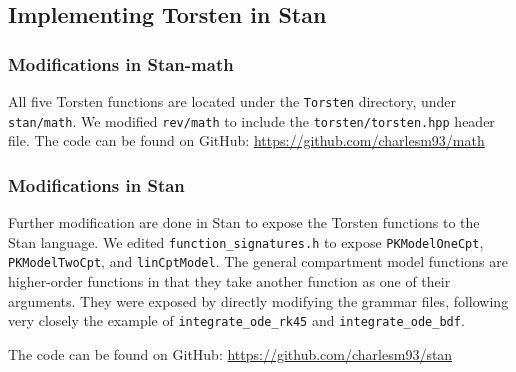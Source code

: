 \documentclass[11pt]{amsart}
\begin{document}
\subsection*{Implementing Torsten in Stan}
\subsubsection*{Modifications in Stan-math}
All five Torsten functions are located under the \texttt{Torsten} directory, under \texttt{stan/math}. We modified \texttt{rev/math} to include the \texttt{torsten/torsten.hpp} header file. The code can be found on GitHub: \url{https://github.com/charlesm93/math} 

\subsubsection*{Modifications in Stan}
Further modification are done in Stan to expose the Torsten functions to the Stan language. We edited \texttt{function\_signatures.h} to expose \texttt{PKModelOneCpt}, \texttt{PKModelTwoCpt}, and \texttt{linCptModel}. The general compartment model functions are higher-order functions in that they take another function as one of their arguments. They were exposed by directly modifying the grammar files, following very closely the example of \texttt{integrate\_ode\_rk45} and \texttt{integrate\_ode\_bdf}.

The code can be found on GitHub:  \url{https://github.com/charlesm93/stan}

\end{document}
